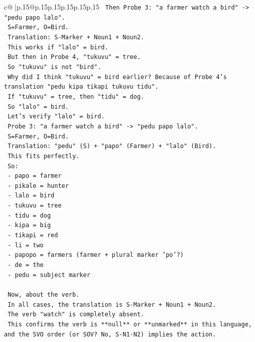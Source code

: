 \documentclass{article}
\begin{document}
{\begin{supertabular}{c@{$\;$}|p{.15\linewidth}@{}p{.15\linewidth}p{.15\linewidth}p{.15\linewidth}p{.15\linewidth}p{.15\linewidth}}
{{{\texttt{    Then Probe 3: "a farmer watch a bird" {-}> "pedu papo lalo".} \\
\texttt{    S=Farmer, O=Bird.} \\
\texttt{    Translation: S{-}Marker + Noun1 + Noun2.} \\
\texttt{    This works if "lalo" = bird.} \\
\texttt{    But then in Probe 4, "tukuvu" = tree.} \\
\texttt{    So "tukuvu" is not "bird".} \\
\texttt{    Why did I think "tukuvu" = bird earlier? Because of Probe 4's translation "pedu kipa tikapi tukuvu tidu".} \\
\texttt{    If "tukuvu" = tree, then "tidu" = dog.} \\
\texttt{    So "lalo" = bird.} \\
\texttt{    Let's verify "lalo" = bird.} \\
\texttt{    Probe 3: "a farmer watch a bird" {-}> "pedu papo lalo".} \\
\texttt{    S=Farmer, O=Bird.} \\
\texttt{    Translation: "pedu" (S) + "papo" (Farmer) + "lalo" (Bird).} \\
\texttt{    This fits perfectly.} \\
\texttt{    So:} \\
\texttt{    {-} papo = farmer} \\
\texttt{    {-} pikale = hunter} \\
\texttt{    {-} lalo = bird} \\
\texttt{    {-} tukuvu = tree} \\
\texttt{    {-} tidu = dog} \\
\texttt{    {-} kipa = big} \\
\texttt{    {-} tikapi = red} \\
\texttt{    {-} li = two} \\
\texttt{    {-} papopo = farmers (farmer + plural marker 'po'?)} \\
\texttt{    {-} de = the} \\
\texttt{    {-} pedu = subject marker} \\
\\ 
\texttt{    Now, about the verb.} \\
\texttt{    In all cases, the translation is S{-}Marker + Noun1 + Noun2.} \\
\texttt{    The verb "watch" is completely absent.} \\
\texttt{    This confirms the verb is **null** or **unmarked** in this language, and the SVO order (or SOV? No, S{-}N1{-}N2) implies the action.} \\
}}}
\end{supertabular}}
\end{document}
